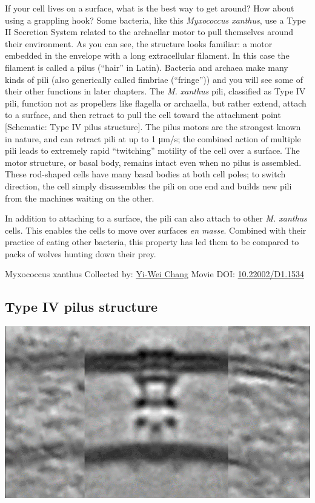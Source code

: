 \documentclass[]{tufte-book}
\begin{document}
If your cell lives on a surface, what is the best way to get around? How about using a grappling hook? Some bacteria, like this \emph{Myxococcus xanthus}, use a Type II Secretion System related to the archaellar motor to pull themselves around their environment. As you can see, the structure looks familiar: a motor embedded in the envelope with a long extracellular filament. In this case the filament is called a pilus (``hair'' in Latin). Bacteria and archaea make many kinds of pili (also generically called fimbriae (``fringe'')) and you will see some of their other functions in later chapters. The \emph{M. xanthus} pili, classified as Type IV pili, function not as propellers like flagella or archaella, but rather extend, attach to a surface, and then retract to pull the cell toward the attachment point {[}Schematic: Type IV pilus structure{]}. The pilus motors are the strongest known in nature, and can retract pili at up to 1 μm/s; the combined action of multiple pili leads to extremely rapid ``twitching'' motility of the cell over a surface. The motor structure, or basal body, remains intact even when no pilus is assembled. These rod-shaped cells have many basal bodies at both cell poles; to switch direction, the cell simply disassembles the pili on one end and builds new pili from the machines waiting on the other.

In addition to attaching to a surface, the pili can also attach to other \emph{M. xanthus} cells. This enables the cells to move over surfaces \emph{en masse}. Combined with their practice of eating other bacteria, this property has led them to be compared to packs of wolves hunting down their prey.



\hypertarget{htmlwidget-29853deec8ebae6b8d76}{}

\label{fig:6-10}Myxococcus xanthus Collected by: \protect\hyperlink{yi-wei_chang}{Yi-Wei Chang} Movie DOI: \href{https://doi.org/10.22002/D1.1534}{10.22002/D1.1534}

\hypertarget{Type_IV_pilus_structure}{%
\subsection{Type IV pilus structure}\label{Type_IV_pilus_structure}}

\includegraphics{img/schematics/6_10_1}
\end{document}
